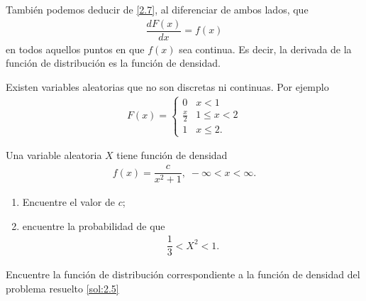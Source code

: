 	También podemos deducir de \eqref{2.7}, al diferenciar de ambos lados, que
	\begin{align}
		\label{2.11}
		\dfrac{dF(x)}{dx} = f(x)
	\end{align}
en todos aquellos puntos en que $f(x)$ sea continua.  Es decir, la derivada de la función de distribución es la función de densidad.


	\begin{rem}
		Existen variables aleatorias que no son discretas ni continuas.  Por ejemplo
		\begin{align}
			F(x)=
			\begin{cases}
				0 & x <1 \\
				\frac{x}{2} & 1 \leq x < 2 \\
				1 & x \leq 2.
			\end{cases}
		\end{align}

	\end{rem}



 \begin{ejemplo}
  \label{sol:2.5} Una variable aleatoria $X$ tiene función de densidad
  \begin{align}
   f(x)=\dfrac{c}{x^{2}+1}, \; -\infty < x <\infty.
  \end{align}

  \begin{enumerate}
   \item Encuentre el valor de $c$; 
   \item encuentre la probabilidad de que
   \begin{align*}
    \dfrac{1}{3}< X^{2} <1.
   \end{align*}

  \end{enumerate}

 \end{ejemplo}



 \begin{ejemplo}
  \label{sol:2.6}
  Encuentre la función de distribución correspondiente a la función de densidad del problema resuelto \ref{sol:2.5}
 \end{ejemplo}



